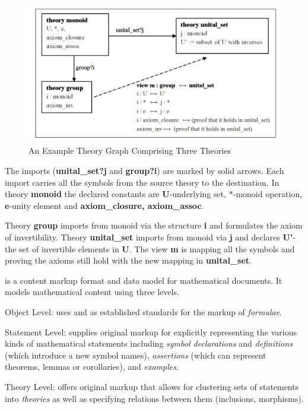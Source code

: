 \begin{figure}[h!] 
\centerline{\includegraphics[scale=0.15]{theories1}}
\caption{An Example Theory Graph Comprising Three Theories \label{img:graph}}
\end{figure}

The imports (\textbf{unital\_set?j} and \textbf{group?i}) are marked by solid arrows. Each import carries all the
symbols from the source theory to the destination. In theory \textbf{monoid} the declared constants are
\textbf{U}-underlying set, $*$-monoid operation, \textbf{e}-unity element and \textbf{axiom\_closure, axiom\_assoc}.

Theory \textbf{group} imports from monoid via the structure \textbf{i} and formulates the axiom of invertibility.
Theory \textbf{unital\_set} imports from monoid via \textbf{j} and declares \textbf{U'}-the set of invertible
elements in \textbf{U}.
The view \textbf{m} is mapping all the symbols and proving the axioms still hold with the new mapping in
\textbf{unital\_set}.

\omdoc \cite{Kohlhase:OMDoc1.2} is a content markup format and data model for mathematical documents. It models
mathematical content using three levels.
\begin{compactdesc}
\item[Object Level:] uses {\openmath} and {\mathml} as established standards for
  the markup of \emph{formulae}.
\item[Statement Level:] supplies original markup for explicitly representing the
  various kinds of mathematical statements including \emph{symbol declarations} and \emph{definitions} (which
  introduce
a new symbol names), \emph{assertions} (which can represent theorems, lemmas or corollaries), and \emph{examples}.
\item[Theory Level:] offers original markup that allows for clustering sets
  of statements into \emph{theories} as well as specifying relations between them
  (inclusions, morphisms).
\end{compactdesc}


